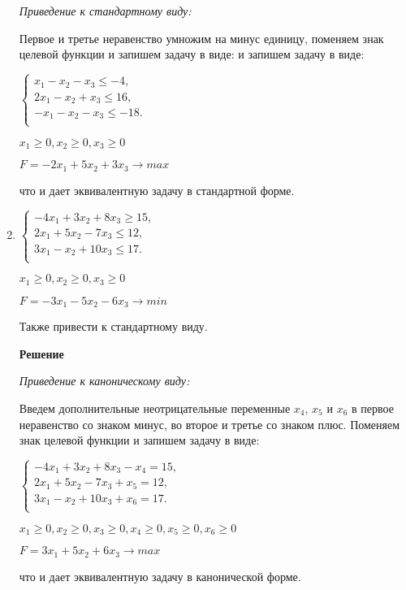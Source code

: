 \documentclass[12pt]{article}
\begin{document}
\begin{enumerate}
\textit{Приведение к стандартному виду:}

Первое и третье неравенство умножим на минус единицу, поменяем знак целевой функции и запишем задачу в виде: и запишем задачу в виде:
\begin{center}

$\begin{cases}
  x_1 -x_2-x_3 \le  -4,\\ 
 2x_1 -x_2 +x_3 \le 16,\\
 -x_1 -x_2 -x_3\le-18.\\
\end{cases}$

$x_1\ge0, x_2\ge0, x_3\ge0$

$F=-2x_1+5x_2+ 3x_3 \rightarrow max$
\end{center}
что и дает эквивалентную задачу в стандартной форме.\newpage
\item
\begin{center}
$\begin{cases}
  -4x_1 +3x_2+8x_3 \ge 15,\\ 
 2x_1 +5x_2 -7x_3 \le 12,\\
 3x_1 -x_2 +10x_3\le17.\\
\end{cases}$

$x_1\ge0, x_2\ge0, x_3\ge0$

$F=-3x_1-5x_2- 6x_3 \rightarrow min$

Также привести к стандартному виду.
\end{center}

\textbf{Решение}

\textit{Приведение к каноническому виду:}

Введем дополнительные неотрицательные переменные $x_4$, $x_5$ и $ x_6$ в первое неравенство со знаком минус, во второе и третье со знаком плюс. Поменяем знак целевой функции и запишем задачу в виде:
\begin{center}
$\begin{cases}
  -4x_1 +3x_2+8x_3 - x_4 =15,\\ 
 2x_1 +5x_2 -7x_3 + x_5 = 12,\\
 3x_1 -x_2 +10x_3 +x_6=17.\\
\end{cases}$

$x_1\ge0, x_2\ge0, x_3\ge0, x_4\ge0, x_5\ge0, x_6\ge0$

$F=3x_1+5x_2+ 6x_3 \rightarrow max$
\end{center}
что и дает эквивалентную задачу в канонической форме.


\end{enumerate}
\end{document}
